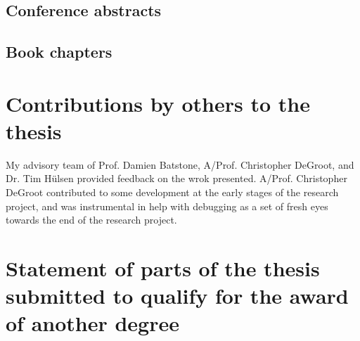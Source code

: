 

\subsection*{Conference abstracts}




\subsection*{Book chapters}




\section*{Contributions by others to the thesis}

My advisory team of Prof. Damien Batstone, A/Prof. Christopher DeGroot, and Dr. Tim H\"{u}lsen provided feedback on the wrok presented. A/Prof. Christopher DeGroot contributed to some development at the early stages of the research project, and was instrumental in help with debugging as a set of fresh eyes towards the end of the research project.

\section*{Statement of parts of the thesis submitted to qualify for the award of another degree}

